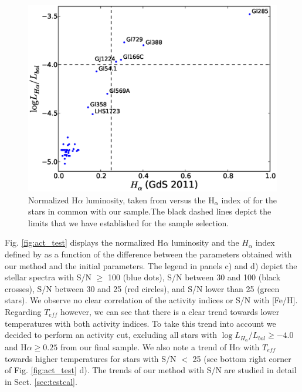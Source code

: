\documentclass{aa}
\begin{document}
\begin{figure}[]
\centering
\includegraphics[scale=0.45]{pics/activity.eps}
\caption{Normalized H$\alpha$ luminosity, taken from \citet{Reiners-2012} versus the H$_{\alpha}$ index of \citet{Gomes_da_Silva-2011} for the stars in common with our sample.The black dashed lines depict the limits that we have established for the sample selection.}
\label{fig:activity}
\end{figure}

Fig. \ref{fig:act_test} displays the normalized H$\alpha$ luminosity and the $H_{\alpha}$ index defined by \citet{Gomes_da_Silva-2011}  as a function of the difference between the parameters obtained with our method and the initial parameters. The legend in panels c) and d) depict the stellar spectra with S/N $\geq$ 100 (blue dots), S/N between 30 and 100 (black crosses), S/N between 30 and 25 (red circles), and S/N lower than 25 (green stars). We observe no clear correlation of the activity indices or S/N with [Fe/H]. Regarding $T_{eff}$ however, we can see that there is a clear trend towards lower temperatures with both activity indices. To take this trend into account we decided to perform an activity cut, excluding all stars with $\log{L_{H_{\alpha}}/L_{bol}} \geq -4.0 $ and H$\alpha \geq 0.25$ from our final sample. We also note a trend of H$\alpha$ with $T_{eff}$ towards higher temperatures for stars with S/N $<$ 25 (see bottom right corner of Fig. \ref{fig:act_test} d). The trends of our method with S/N are studied in detail in Sect. \ref{sec:testcal}. 
\end{document}
